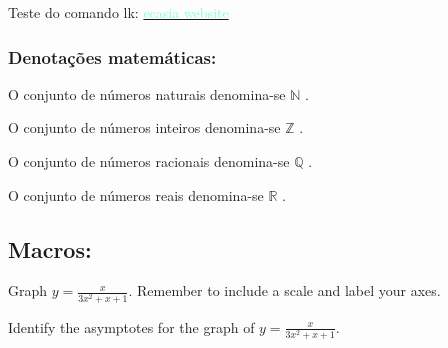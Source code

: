\documentclass[a4paper]{article}
\def\eq1{y=\frac{x}{3x^2+x+1}}
\def\labelaxes{Remember to include a scale and label your axes.}
\newcommand{\lk}[2]{\href{#1}{\textcolor{aquamarine}{#2}}}
\begin{document}
    
    Teste do comando lk:
    \lk{http://ecasia.com}{ecasia website}

\subsubsection{Denotações matemáticas:}    
\par\indent    
    O conjunto de números naturais denomina-se
    $\mathbb{N}$
    .
    
    O conjunto de números inteiros denomina-se
    $\mathbb{Z}$
    .
    
    O conjunto de números racionais denomina-se
    $\mathbb{Q}$
    .
    
    O conjunto de números reais denomina-se
    $\mathbb{R}$
    .
    
    \subsection{Macros:}
    
    Graph $\eq1$. \labelaxes
    
    Identify the asymptotes for the graph of $\eq1$.
    
    
    
    
\end{document}
